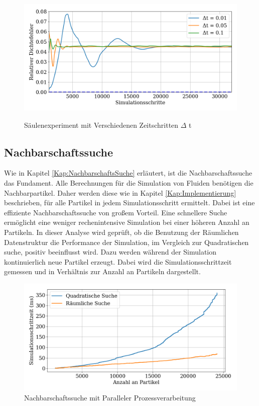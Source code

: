 \documentclass[a4paper, 12pt]{article}
\begin{document}
\begin{figure}[H]
	\centering
	\includegraphics[width=.85\textwidth]{graphics/Zeitschritt.png}	
	\label{Säulenexperiment_t}
	\caption{Säulenexperiment mit Verschiedenen Zeitschritten $\Delta$ t}
\end{figure}

\subsection{Nachbarschaftssuche}
Wie in Kapitel \ref{Kap:NachbarschaftsSuche} erläutert, ist die Nachbarschaftssuche das Fundament. Alle Berechnungen für die Simulation von Fluiden benötigen die Nachbarpartikel. Daher werden diese wie in Kapitel \ref{Kap:Implementierung} beschrieben, für alle Partikel in jedem Simulationsschritt ermittelt. Dabei ist eine effiziente Nachbarschaftssuche von großem Vorteil. Eine schnellere Suche ermöglicht eine weniger rechenintensive Simulation bei einer höheren Anzahl an Partikeln. In dieser Analyse wird geprüft, ob die Benutzung der Räumlichen Datenstruktur die Performance der Simulation, im Vergleich zur Quadratischen suche, positiv beeinflusst wird. Dazu werden während der Simulation kontinuierlich neue Partikel erzeugt. Dabei wird die Simulationsschrittzeit gemessen und in Verhältnis zur Anzahl an Partikeln dargestellt.

\begin{figure}[H]
	\centering
	\includegraphics[width=.85\textwidth]{graphics/Nachbarschafts-Suche.png}
	\caption{Nachbarschaftssuche mit Paralleler Prozessverarbeitung}
	\label{NachbarschaftsSuche}
\end{figure}
\end{document}
